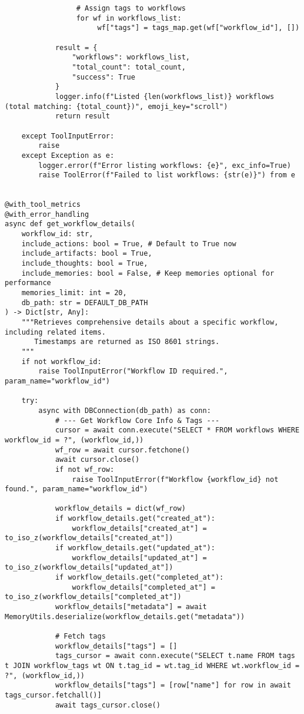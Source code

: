 \documentclass[12pt,a4paper]{article}
\begin{document}
\begin{pageablecode}
\begin{verbatim}
                 # Assign tags to workflows
                 for wf in workflows_list:
                      wf["tags"] = tags_map.get(wf["workflow_id"], [])

            result = {
                "workflows": workflows_list,
                "total_count": total_count,
                "success": True
            }
            logger.info(f"Listed {len(workflows_list)} workflows (total matching: {total_count})", emoji_key="scroll")
            return result

    except ToolInputError:
        raise
    except Exception as e:
        logger.error(f"Error listing workflows: {e}", exc_info=True)
        raise ToolError(f"Failed to list workflows: {str(e)}") from e


@with_tool_metrics
@with_error_handling
async def get_workflow_details(
    workflow_id: str,
    include_actions: bool = True, # Default to True now
    include_artifacts: bool = True,
    include_thoughts: bool = True,
    include_memories: bool = False, # Keep memories optional for performance
    memories_limit: int = 20,
    db_path: str = DEFAULT_DB_PATH
) -> Dict[str, Any]:
    """Retrieves comprehensive details about a specific workflow, including related items.
       Timestamps are returned as ISO 8601 strings.
    """
    if not workflow_id:
        raise ToolInputError("Workflow ID required.", param_name="workflow_id")

    try:
        async with DBConnection(db_path) as conn:
            # --- Get Workflow Core Info & Tags ---
            cursor = await conn.execute("SELECT * FROM workflows WHERE workflow_id = ?", (workflow_id,))
            wf_row = await cursor.fetchone()
            await cursor.close()
            if not wf_row:
                raise ToolInputError(f"Workflow {workflow_id} not found.", param_name="workflow_id")

            workflow_details = dict(wf_row)
            if workflow_details.get("created_at"):
                workflow_details["created_at"] = to_iso_z(workflow_details["created_at"])
            if workflow_details.get("updated_at"):
                workflow_details["updated_at"] = to_iso_z(workflow_details["updated_at"])
            if workflow_details.get("completed_at"):
                workflow_details["completed_at"] = to_iso_z(workflow_details["completed_at"])
            workflow_details["metadata"] = await MemoryUtils.deserialize(workflow_details.get("metadata"))

            # Fetch tags
            workflow_details["tags"] = []
            tags_cursor = await conn.execute("SELECT t.name FROM tags t JOIN workflow_tags wt ON t.tag_id = wt.tag_id WHERE wt.workflow_id = ?", (workflow_id,))
            workflow_details["tags"] = [row["name"] for row in await tags_cursor.fetchall()]
            await tags_cursor.close()


\end{verbatim}
\end{pageablecode}
\end{document}
